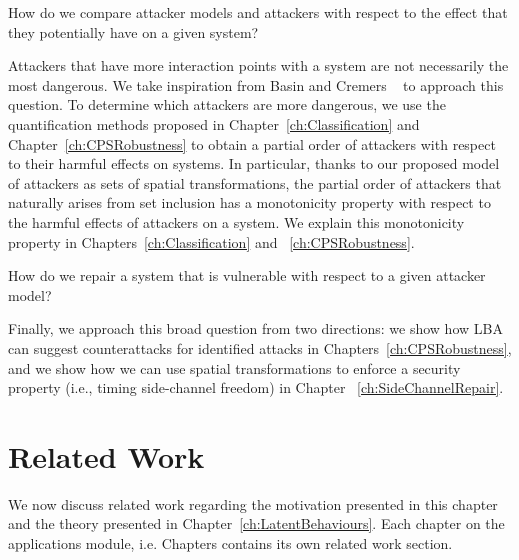 \begin{question}
\label{que:Classification}
How do we compare attacker models and attackers with respect to the effect that they potentially have on a given system?
\end{question}
Attackers that have more interaction points with a system are not necessarily the most dangerous. We take inspiration from Basin and Cremers ~\cite{KnowYourEnemy} to approach this question. To determine which attackers are more dangerous, we use the quantification methods proposed in Chapter~\ref{ch:Classification} and Chapter~\ref{ch:CPSRobustness} to obtain a partial order of attackers with respect to their harmful effects on systems. In particular, thanks to our proposed model of attackers as sets of spatial transformations, the partial order of attackers that naturally arises from set inclusion has a monotonicity property with respect to the harmful effects of attackers on a system. We explain this monotonicity property in Chapters~\ref{ch:Classification} and ~\ref{ch:CPSRobustness}.
\begin{question}
\label{que:Repair}
How do we repair a system that is vulnerable with respect to a given attacker model?
\end{question}
Finally, we approach this broad question from two directions: we show how LBA can suggest counterattacks for identified attacks in Chapters~\ref{ch:CPSRobustness}, 
and we show how we can use spatial transformations to enforce a security property (i.e., timing side-channel freedom) in Chapter ~\ref{ch:SideChannelRepair}. 

\section{Related Work}
We now discuss related work regarding the motivation presented in this chapter and the theory presented in Chapter~\ref{ch:LatentBehaviours}. Each chapter on the applications module, i.e. Chapters contains its own related work section.


